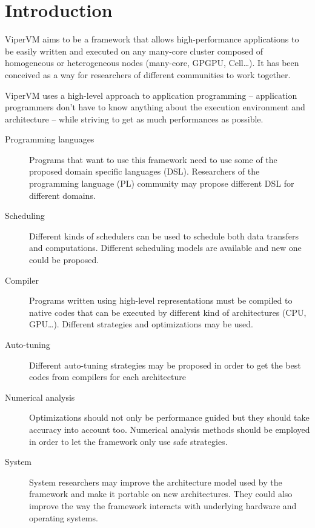 \chapter{Introduction}

ViperVM  aims to be  a framework that allows high-performance applications to
be easily written and executed on any many-core cluster composed of homogeneous or
heterogeneous nodes (many-core, GPGPU, Cell\ldots). It has been conceived as a
way for researchers of different communities to work together.

ViperVM uses a high-level approach to application programming -- application
programmers don't have to know anything about the execution environment and
architecture -- while striving to get as much performances as possible.

\begin{description}
  \item[Programming languages] Programs that want to use this framework need to
  use some of the proposed domain specific languages (DSL).  Researchers of the
  programming language (PL) community may propose different DSL for different
  domains.

  \item[Scheduling] Different kinds of schedulers can be used to schedule both
  data transfers and computations.  Different scheduling models are available
  and new one could be proposed.

  \item[Compiler] Programs written using high-level representations must be
  compiled to native codes that can be executed by different kind of
  architectures (CPU, GPU\ldots).  Different strategies and optimizations may be
  used.

  \item[Auto-tuning] Different auto-tuning strategies may be proposed in order
  to get the best codes from compilers for each architecture

  \item[Numerical analysis] Optimizations should not only be performance guided
  but they should take accuracy into account too.  Numerical analysis methods
  should be employed in order to let the framework only use safe strategies.

  \item[System] System researchers may improve the architecture model used by
  the framework and make it portable on new architectures.  They could also
  improve the way the framework interacts with underlying hardware and operating
  systems.

\end{description}
